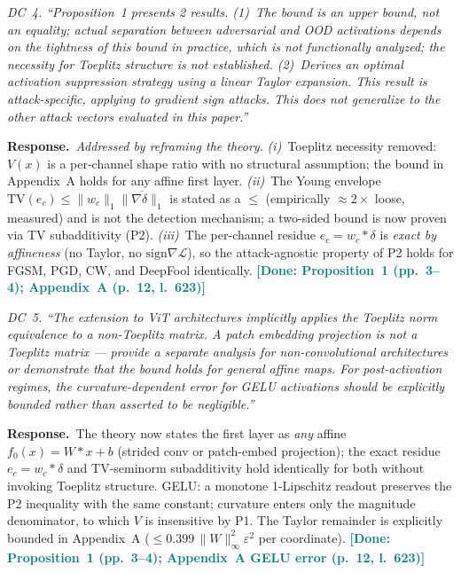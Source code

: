 \documentclass[10pt,letterpaper,journal]{IEEEtran}
\newcommand{\rc}[1]{\smallskip\noindent\textit{\textcolor{black!75}{#1}}\par\smallskip}
\newcommand{\rr}{\noindent\textbf{Response.}~}
\newcommand{\done}[1]{\textcolor{teal}{\textbf{[Done: #1]}}}
\begin{document}
\rc{DC~4. ``Proposition~1 presents 2 results. (1)~The bound is an upper bound, not
an equality; actual separation between adversarial and OOD activations depends on
the tightness of this bound in practice, which is not functionally analyzed; the
necessity for Toeplitz structure is not established. (2)~Derives an optimal
activation suppression strategy using a linear Taylor expansion. This result is
attack-specific, applying to gradient sign attacks. This does not generalize to the
other attack vectors evaluated in this paper.''}

\rr \emph{Addressed by reframing the theory.}
\textit{(i)}~Toeplitz necessity removed: $V(x)$ is a per-channel shape ratio with
no structural assumption; the bound in Appendix~A holds for any affine first layer.
\textit{(ii)}~The Young envelope $\mathrm{TV}(e_c)\le\|w_c\|_1\overline{\|\nabla\delta\|_1}$
is stated as a $\le$ (empirically $\approx2\times$ loose, measured) and is not the
detection mechanism; a two-sided bound is now proven via TV subadditivity (P2).
\textit{(iii)}~The per-channel residue $e_c=w_c\!\ast\delta$ is \emph{exact by
affineness} (no Taylor, no $\mathrm{sign}\nabla\mathcal{L}$), so the
attack-agnostic property of P2 holds for FGSM, PGD, CW, and DeepFool identically.
\done{Proposition~1 (pp.~3--4); Appendix~A (p.~12, l.~623)}

\rc{DC~5. ``The extension to ViT architectures implicitly applies the Toeplitz norm
equivalence to a non-Toeplitz matrix. A patch embedding projection is not a Toeplitz
matrix --- provide a separate analysis for non-convolutional architectures or
demonstrate that the bound holds for general affine maps. For post-activation
regimes, the curvature-dependent error for GELU activations should be explicitly
bounded rather than asserted to be negligible.''}

\rr The theory now states the first layer as \emph{any} affine $f_0(x)=W\!\ast x+b$
(strided conv or patch-embed projection); the exact residue $e_c=w_c\!\ast\delta$
and TV-seminorm subadditivity hold identically for both without invoking Toeplitz
structure. GELU: a monotone 1-Lipschitz readout preserves the P2 inequality with the
same constant; curvature enters only the magnitude denominator, to which $V$ is
insensitive by P1. The Taylor remainder is explicitly bounded in Appendix~A
($\le0.399\,\|W\|_\infty^2\varepsilon^2$ per coordinate).
\done{Proposition~1 (pp.~3--4); Appendix~A GELU error (p.~12, l.~623)}
\end{document}
